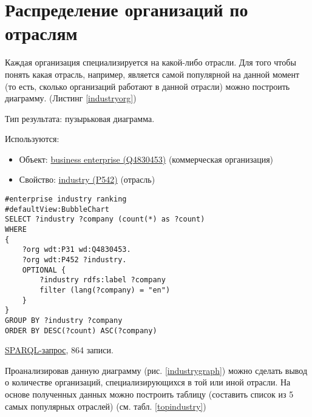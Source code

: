 \section*{Распределение организаций по отраслям}

Каждая организация специализируется на какой-либо отрасли. Для того чтобы понять какая отрасль, например, является самой популярной на данной момент (то есть, сколько организаций работают в данной отрасли) можно построить диаграмму. (Листинг \ref{industryorg})

Тип результата: пузырьковая диаграмма. 

Используются:
\begin{itemize}
    \item Объект: \href{https://www.wikidata.org/wiki/Q4830453}{business enterprise (Q4830453)} (коммерческая организация)
    \item Свойство: \href{https://www.wikidata.org/wiki/Property:P452}{industry (P542)} (отрасль)
\end{itemize}

\begin{lstlisting}[language=SPARQL,label=industryorg,caption=Диаграмма распределения организаций по отраслям]
#enterprise industry ranking
#defaultView:BubbleChart
SELECT ?industry ?company (count(*) as ?count)
WHERE 
{
    ?org wdt:P31 wd:Q4830453.
    ?org wdt:P452 ?industry.
    OPTIONAL {
		?industry rdfs:label ?company
		filter (lang(?company) = "en")
	}
}
GROUP BY ?industry ?company
ORDER BY DESC(?count) ASC(?company)
\end{lstlisting}

\href{https://query.wikidata.org/#%23enterprise%20industry%20ranking%0A%23defaultView%3ABubbleChart%0ASELECT%20%3Findustry%20%3Fcompany%20%28count%28%2a%29%20as%20%3Fcount%29%0AWHERE%20%0A%7B%0A%20%20%20%20%3Forg%20wdt%3AP31%20wd%3AQ4830453.%0A%20%20%20%20%3Forg%20wdt%3AP452%20%3Findustry%20.%0A%20%20%20%20OPTIONAL%20%7B%0A%09%09%3Findustry%20rdfs%3Alabel%20%3Fcompany%0A%09%09filter%20%28lang%28%3Fcompany%29%20%3D%20%22en%22%29%0A%09%7D%0A%7D%0AGROUP%20BY%20%3Findustry%20%3Fcompany%0AORDER%20BY%20DESC%28%3Fcount%29%20ASC%28%3Fcompany%29%0A}{SPARQL-запрос}, 864 записи.

Проанализировав данную диаграмму (рис. \ref{industrygraph}) можно сделать вывод о количестве организаций, специализирующихся в той или иной отрасли. На основе полученных данных можно построить таблицу (составить список из 5 самых популярных отраслей) (см. табл. \ref{topindustry})
 
